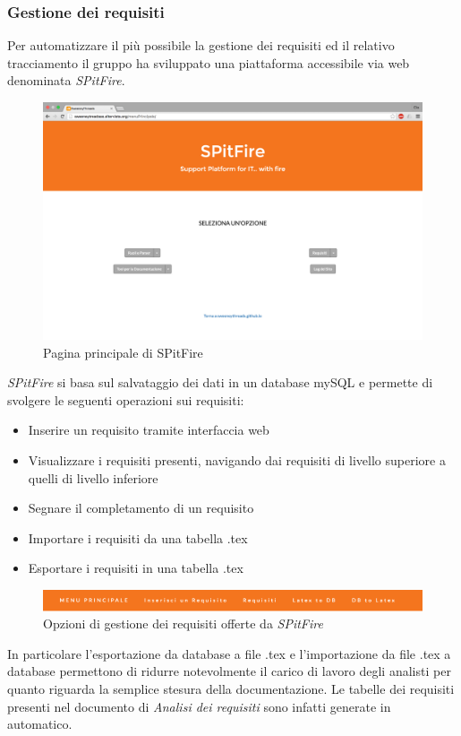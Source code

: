 \documentclass[a4paper]{article}
\begin{document}
		\subsubsection{Gestione dei requisiti}
        Per automatizzare il più possibile la gestione dei requisiti ed il relativo tracciamento il gruppo ha sviluppato una piattaforma accessibile via web denominata \emph{SPitFire}.
        \begin{figure}[H]
				\centering
				\includegraphics[width=\textwidth]{spitfire.png}
				\caption{Pagina principale di SPitFire}
			\end{figure}
        \emph{SPitFire} si basa sul salvataggio dei dati in un database mySQL e permette di svolgere le seguenti operazioni sui requisiti:
        \begin{itemize}
        	\item Inserire un requisito tramite interfaccia web
        	\item Visualizzare i requisiti presenti, navigando dai requisiti di livello superiore a quelli di livello inferiore
        	\item Segnare il completamento di un requisito
        	\item Importare i requisiti da una tabella .tex
        	\item Esportare i requisiti in una tabella .tex
        \end{itemize}
        \begin{figure}[H]
				\centering
				\includegraphics[width=\textwidth]{spitfire-opzioni-requisiti.png}
				\caption{Opzioni di gestione dei requisiti offerte da \emph{SPitFire}}
			\end{figure}
			In particolare l'esportazione da database a file .tex e l'importazione da file .tex a database permettono di ridurre notevolmente il carico di lavoro degli analisti per quanto riguarda la semplice stesura della documentazione. Le tabelle dei requisiti presenti nel documento di \emph{Analisi dei requisiti} sono infatti generate in automatico.
        
\end{document}
